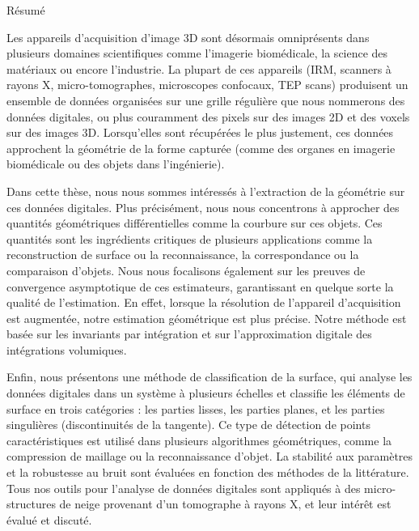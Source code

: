 {Résumé}
\label{sec:abstract-french}
\vspace*{5mm}

Les appareils d'acquisition d'image 3D sont désormais omniprésents dans
plusieurs domaines scientifiques comme l'imagerie biomédicale, la science des
matériaux ou encore l'industrie. La plupart de ces appareils (IRM, scanners à
rayons X, micro-tomographes, microscopes confocaux, TEP scans) produisent un
ensemble de données organisées sur une grille régulière que nous nommerons des
données digitales, ou plus couramment des pixels sur des images 2D et des voxels
sur des images 3D. Lorsqu'elles sont récupérées le plus justement, ces données
approchent la géométrie de la forme capturée (comme des organes en imagerie
biomédicale ou des objets dans l'ingénierie).

Dans cette thèse, nous nous sommes intéressés à l'extraction de la géométrie sur
ces données digitales. Plus précisément, nous nous concentrons à approcher des
quantités géométriques différentielles comme la courbure sur ces objets. Ces
quantités sont les ingrédients critiques de plusieurs applications comme la
reconstruction de surface ou la reconnaissance, la correspondance ou la
comparaison d'objets. Nous nous focalisons également sur les preuves de
convergence asymptotique de ces estimateurs, garantissant en quelque sorte la
qualité de l'estimation. En effet, lorsque la résolution de l'appareil
d'acquisition est augmentée, notre estimation géométrique est plus précise.
Notre méthode est basée sur les invariants par intégration et sur
l'approximation digitale des intégrations volumiques.

Enfin, nous présentons une méthode de classification de la surface, qui analyse
les données digitales dans un système à plusieurs échelles et classifie les
éléments de surface en trois catégories : les parties lisses, les parties
planes, et les parties singulières (discontinuités de la tangente). Ce type de
détection de points caractéristiques est utilisé dans plusieurs algorithmes
géométriques, comme la compression de maillage ou la reconnaissance d'objet. La
stabilité aux paramètres et la robustesse au bruit sont évaluées en fonction des
méthodes de la littérature. Tous nos outils pour l'analyse de données digitales
sont appliqués à des micro-structures de neige provenant d'un tomographe à
rayons X, et leur intérêt est évalué et discuté.
